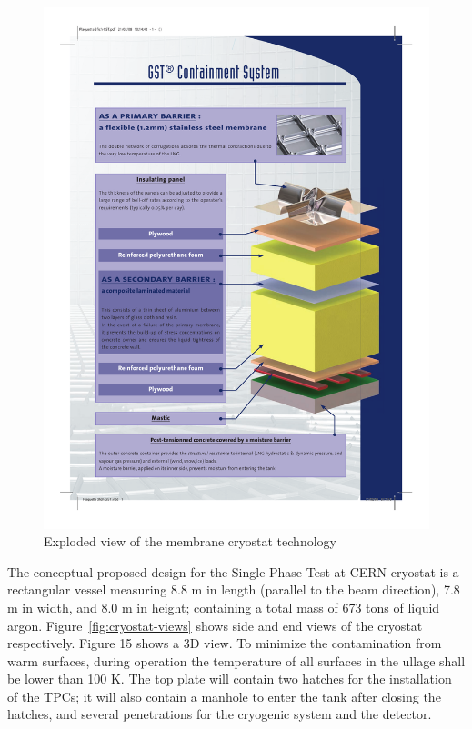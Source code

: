 \begin{figure}[htbp]
\begin{center}
\includegraphics[width=.9\textwidth]{figures/membrane-exploded-view}
\caption[Exploded view of the membrane cryostat technology]{\label{fig:lar-org} Exploded view of the membrane cryostat technology}
\end{center}
\end{figure}

The conceptual proposed design for the Single Phase Test at CERN cryostat is a rectangular vessel measuring 8.8 m in length (parallel to the beam direction), 7.8 m in width, and 8.0 m in height; containing a total mass of 673 tons of liquid argon. Figure~\ref{fig:cryostat-views} shows side and end views of the cryostat respectively. Figure 15 shows a 3D view. To minimize the contamination from warm surfaces, during operation the temperature of all surfaces in the ullage shall be lower than 100 K. 
The top plate will contain two hatches for the installation of the TPCs; it will also contain a manhole to enter the tank after closing the hatches, and several penetrations for the cryogenic system and the detector. 

